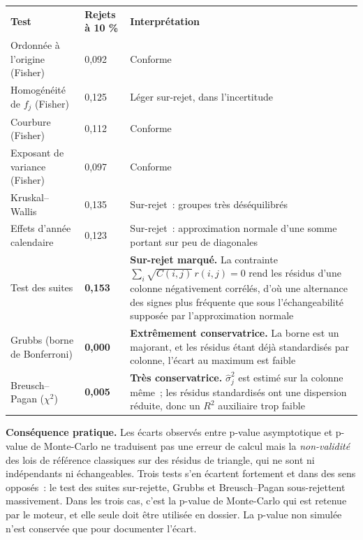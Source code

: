 \documentclass[a4paper,11pt]{article}
\begin{document}
\begin{center}
\small
{}
\begin{tabular}{@{}p{5.1cm}p{1.9cm}p{8.0cm}@{}}
\rowcolor{tableheader}
\textcolor{financeblue}{\textbf{Test}} &
\textcolor{financeblue}{\textbf{Rejets à 10 \%}} &
\textcolor{financeblue}{\textbf{Interprétation}} \\
Ordonnée à l'origine (Fisher) & 0,092 & Conforme \\
Homogénéité de $f_j$ (Fisher) & 0,125 & Léger sur-rejet, dans l'incertitude \\
Courbure (Fisher) & 0,112 & Conforme \\
Exposant de variance (Fisher) & 0,097 & Conforme \\
Kruskal--Wallis & 0,135 & Sur-rejet~: groupes très déséquilibrés \\
Effets d'année calendaire & 0,123 & Sur-rejet~: approximation normale d'une somme
portant sur peu de diagonales \\
Test des suites & \textbf{0,153} & \textbf{Sur-rejet marqué.} La contrainte
$\sum_i \sqrt{C(i,j)}\,r(i,j) = 0$ rend les résidus d'une colonne négativement
corrélés, d'où une alternance des signes plus fréquente que sous
l'échangeabilité supposée par l'approximation normale \\
Grubbs (borne de Bonferroni) & \textbf{0,000} & \textbf{Extrêmement
conservatrice.} La borne est un majorant, et les résidus étant déjà standardisés
par colonne, l'écart au maximum est faible \\
Breusch--Pagan ($\chi^2$) & \textbf{0,005} & \textbf{Très conservatrice.}
$\hat\sigma_j^2$ est estimé sur la colonne même~; les résidus standardisés ont
une dispersion réduite, donc un $R^2$ auxiliaire trop faible \\
\end{tabular}
\end{center}

\begin{encadre}
\textbf{Conséquence pratique.} Les écarts observés entre p-value asymptotique et
p-value de Monte-Carlo ne traduisent pas une erreur de calcul mais la
\emph{non-validité} des lois de référence classiques sur des résidus de triangle,
qui ne sont ni indépendants ni échangeables. Trois tests s'en écartent fortement
et dans des sens opposés~: le test des suites sur-rejette, Grubbs et
Breusch--Pagan sous-rejettent massivement. Dans les trois cas, c'est la p-value
de Monte-Carlo qui est retenue par le moteur, et elle seule doit être utilisée en
dossier. La p-value non simulée n'est conservée que pour documenter l'écart.
\end{encadre}
\end{document}
